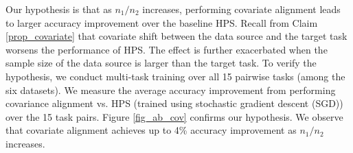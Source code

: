 Our hypothesis is that as $n_1 / n_2$ increases, performing covariate alignment leads to larger accuracy improvement over the baseline HPS.
Recall from Claim \ref{prop_covariate} that covariate shift between the data source and the target task worsens the performance of HPS.
The effect is further exacerbated when the sample size of the data source is larger than the target task.
To verify the hypothesis, we conduct multi-task training over all 15 pairwise tasks (among the six datasets).
We measure the average accuracy improvement from performing covariance alignment vs. HPS (trained using stochastic gradient descent (SGD)) over the 15 task pairs.
Figure \ref{fig_ab_cov} confirms our hypothesis.
We observe that covariate alignment achieves up to 4\% accuracy improvement as $n_1 / n_2$ increases.

